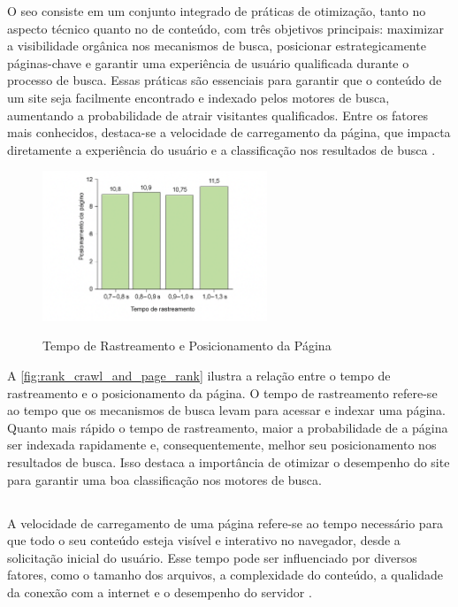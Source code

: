 O \acrfull{seo} consiste em um conjunto integrado de práticas de otimização, tanto no aspecto técnico quanto no de conteúdo, com três objetivos principais: maximizar a visibilidade orgânica nos mecanismos de busca, posicionar estrategicamente páginas-chave e garantir uma experiência de usuário qualificada durante o processo de busca. Essas práticas são essenciais para garantir que o conteúdo de um site seja facilmente encontrado e indexado pelos motores de busca, aumentando a probabilidade de atrair visitantes qualificados. Entre os fatores mais conhecidos, destaca-se a velocidade de carregamento da página, que impacta diretamente a experiência do usuário e a classificação nos resultados de busca \cite{conor2022}.
\begin{figure}[H]
    \centering
    \caption{Tempo de Rastreamento e Posicionamento da Página}
    \includegraphics[width=0.6\textwidth]{media/rank_crawl_and_page_rank.png}
    \label{fig:rank_crawl_and_page_rank}
\end{figure}

A \autoref{fig:rank_crawl_and_page_rank} ilustra a relação entre o tempo de rastreamento e o posicionamento da página. O tempo de rastreamento refere-se ao tempo que os mecanismos de busca levam para acessar e indexar uma página. Quanto mais rápido o tempo de rastreamento, maior a probabilidade de a página ser indexada rapidamente e, consequentemente, melhor seu posicionamento nos resultados de busca. Isso destaca a importância de otimizar o desempenho do site para garantir uma boa classificação nos motores de busca.

\subsection{}
\label{sec:velocidade da página}

A velocidade de carregamento de uma página refere-se ao tempo necessário para que todo o seu conteúdo esteja visível e interativo no navegador, desde a solicitação inicial do usuário. Esse tempo pode ser influenciado por diversos fatores, como o tamanho dos arquivos, a complexidade do conteúdo, a qualidade da conexão com a internet e o desempenho do servidor \cite{shopify2024}.

